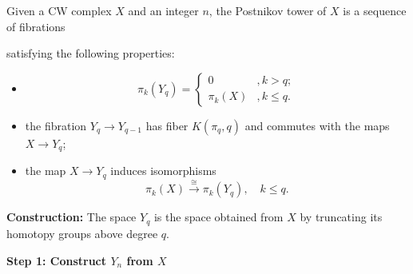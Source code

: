     \begin{definition}
        Given a CW complex $X$ and an integer $n$, the Postnikov tower of $X$ is a sequence 
        of fibrations
        \begin{center}
        \end{center}
        satisfying the following properties:
        \begin{itemize}
            \item 
            \begin{equation*}
                \pi_k(Y_q) = 
                \begin{cases}
                    0 &, k>q; \\
                    \pi_k(X) &, k\leq q.
                \end{cases}
            \end{equation*}
            \item the fibration $Y_q\to Y_{q-1}$ has fiber $K(\pi_q,q)$ 
            and commutes with the maps $X\to Y_q$; 
            \item the map $X\to Y_q$ induces isomorphisms
            \begin{equation*}
                \pi_k(X) \xrightarrow{\cong} \pi_k(Y_q), \quad k\leq q.
            \end{equation*}
        \end{itemize}
    \end{definition}
    \textbf{Construction:}
    The space $Y_q$ is the space obtained from $X$ by truncating 
    its homotopy groups above degree $q$. 

    \textbf{Step 1: Construct $Y_n$ from $X$}
    
